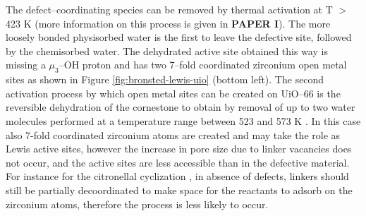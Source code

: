 \npar
The defect--coordinating species can be removed by thermal activation at T $>$ 423 K (more information on this process is given in \textbf{PAPER I}). The more loosely bonded physisorbed water is the first to leave the defective site, followed by the chemisorbed water. The dehydrated active site obtained this way is missing a $\mu_{3}$--OH proton and has two 7--fold coordinated zirconium open metal sites as shown in Figure \ref{fig:bronsted-lewis-uio} (bottom left). 
\npar
The second activation process by which open metal sites can be created on UiO--66 is the reversible dehydration of the  cornestone to obtain  by removal of up to two water molecules performed at a temperature range between 523 and 573 K \cite{valenzano2011disclosing}. In this case also 7-fold coordinated zirconium atoms are created and may take the role as Lewis active sites, however the increase in pore size due to linker vacancies does not occur, and the active sites are less accessible than in the defective material. For instance for the citronellal cyclization \cite{vermoortele2012electronic}, in absence of defects, linkers should still be partially decoordinated to make space for the reactants to adsorb on the zirconium atoms, therefore the process is less likely to occur.


